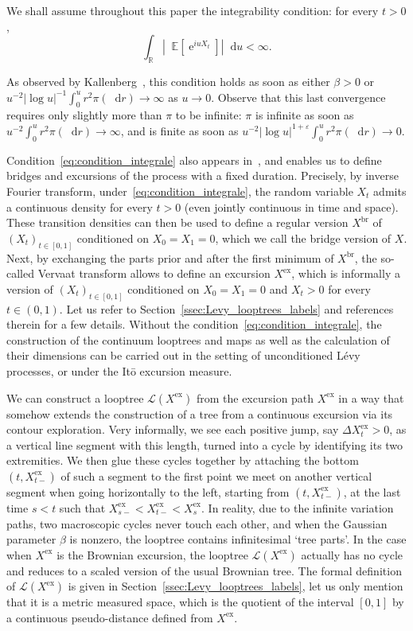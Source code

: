 \documentclass[british, a4paper,11pt]{article}
\numberwithin{equation}{section}
\theoremstyle{definition}
\newcommand{\E}{\mathop{}\!\mathbb{E}}
\newcommand{\R}{\mathbb{R}}
\newcommand{\Loop}{\mathscr{L}}
\newcommand{\e}{\operatorname{e}}
\renewcommand{\d}{\mathop{}\!\mathrm{d}}
\newcommand{\exc}{\mathrm{ex}}
\newcommand{\br}{\mathrm{br}}
\begin{document}
We shall assume throughout this paper the integrability condition:
for every $t > 0$,
\begin{equation}\label{eq:condition_integrale}
\int_{\R} |\E[\e^{i u X_t}]| \d u < \infty
.\end{equation}

As observed by Kallenberg~\cite[Section~5]{Kal81}, this condition holds as soon as either $\beta>0$ or $u^{-2} |\log u|^{-1} \int_0^u r^2 \pi(\d r) \to \infty$ as $u\to 0$. 
Observe that this last convergence requires only slightly 
more than $\pi$ to be infinite: $\pi$ is infinite as soon as $u^{-2}  \int_0^u r^2 \pi(\d r) \to \infty$, and is finite as soon as $u^{-2} |\log u|^{1+\varepsilon} \int_0^u r^2 \pi(\d r) \to 0$.


Condition~\eqref{eq:condition_integrale} also appears in~\cite{Kni96,UB14}, and enables us to define bridges and excursions of the process with a fixed duration. Precisely, by inverse Fourier transform, under~\eqref{eq:condition_integrale}, the random variable $X_t$ admits a continuous density for every $t>0$ (even jointly continuous in time and space).
These transition densities can then be used to define a regular version $X^{\br}$ of $(X_t)_{t \in [0,1]}$ conditioned on $X_0 = X_1 = 0$, which we call the bridge version of $X$.
Next, by exchanging the parts prior and after the first minimum of $X^{\br}$, the so-called Vervaat transform allows to define an excursion $X^{\exc}$, which is informally a version of $(X_t)_{t \in [0,1]}$ conditioned on $X_0 = X_1 = 0$ and $X_t > 0$ for every $t \in (0,1)$.
Let us refer to Section~\ref{ssec:Levy_looptrees_labels} and references therein for a few details.
Without the condition~\eqref{eq:condition_integrale}, the construction of the continuum looptrees and maps as well as the calculation of their dimensions can be carried out in the setting of unconditioned L\'evy processes, or under the It\=o excursion measure.


We can construct a looptree $\Loop(X^{\exc})$ from the excursion path $X^{\exc}$ in a way that somehow extends the construction of a tree from a continuous excursion via its contour exploration. 
Very informally, we see each positive jump, say $\Delta X^{\exc}_t>0$, as a vertical line segment with this length, turned into a cycle by identifying its two extremities. We then glue these cycles together by attaching the bottom $(t, X^{\exc}_{t-})$ of such a segment to the first point we meet on another vertical segment when going horizontally to the left, starting from $(t,X^{\exc}_{t-})$, at the last time $s<t$ such that $X^{\exc}_{s-} < X^{\exc}_{t-} < X^{\exc}_s$. In reality, due to the infinite variation paths, two macroscopic cycles never touch each other, and when the Gaussian parameter $\beta$ is nonzero, the looptree contains infinitesimal `tree parts'.
In the case when $X^{\exc}$ is the Brownian excursion, the looptree $\Loop(X^{\exc})$ actually has no cycle and reduces to a scaled version of the usual Brownian tree.
The formal definition of $\Loop(X^{\exc})$ is given in Section~\ref{ssec:Levy_looptrees_labels}, let us only mention that it is a metric measured space, which is the quotient of the interval $[0,1]$ by a continuous pseudo-distance defined from $X^{\exc}$.
\end{document}
